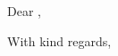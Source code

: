 \documentclass[10pt]{letter}
\begin{document}
\begin{letter}{\receivername \\ \receiveraddressline \\ \receivercity}

\opening{\textbf{}}

Dear \receivername,

\content

\newline\newline\newline\newline
With kind regards,
\newline\newline\newline\newline
\sendername


\end{letter}
\end{document}
